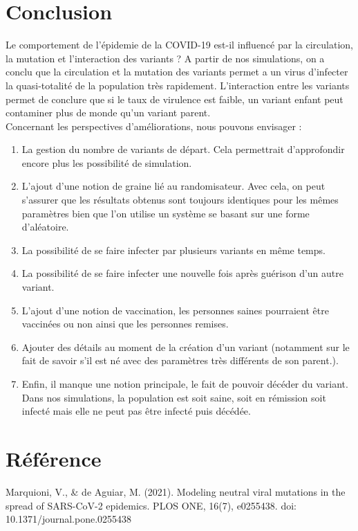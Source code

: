 \documentclass{article}
\begin{document}
\section{Conclusion}

Le comportement de l'épidemie de la COVID-19 est-il influencé par la circulation, la mutation et l'interaction des variants ?
A partir de nos simulations, on a conclu que la circulation et la mutation des variants permet a un virus d'infecter la quasi-totalité de la population très rapidement. L'interaction entre les variants permet de conclure que si le taux de virulence est faible, un variant enfant peut contaminer plus de monde qu'un variant parent. \\
\noindent
Concernant les perspectives d'améliorations, nous pouvons envisager :
\begin{enumerate}
    \item La gestion du nombre de variants de départ. Cela permettrait d'approfondir encore plus les possibilité de simulation.
    \item L'ajout d'une notion de graine lié au randomisateur. Avec cela, on peut s'assurer que les résultats obtenus sont toujours identiques pour les mêmes paramètres bien que l'on utilise un système se basant sur une forme d'aléatoire.
    \item La possibilité de se faire infecter par plusieurs variants en même temps.
    \item La possibilité de se faire infecter une nouvelle fois après guérison d'un autre variant.
    \item L'ajout d'une notion de vaccination, les personnes saines pourraient être vaccinées ou non ainsi que les personnes remises.
    \item Ajouter des détails au moment de la création d'un variant (notamment sur le fait de savoir s'il est né avec des paramètres très différents de son parent.).
    \item Enfin, il manque une notion principale, le fait de pouvoir décéder du variant. Dans nos simulations, la population est soit saine, soit en rémission soit infecté mais elle ne peut pas être infecté puis décédée.
\end{enumerate}

\section{Référence}

Marquioni, V., & de Aguiar, M. (2021). Modeling neutral viral mutations in the spread of SARS-CoV-2 epidemics. PLOS ONE, 16(7), e0255438. doi: 10.1371/journal.pone.0255438
\end{document}
